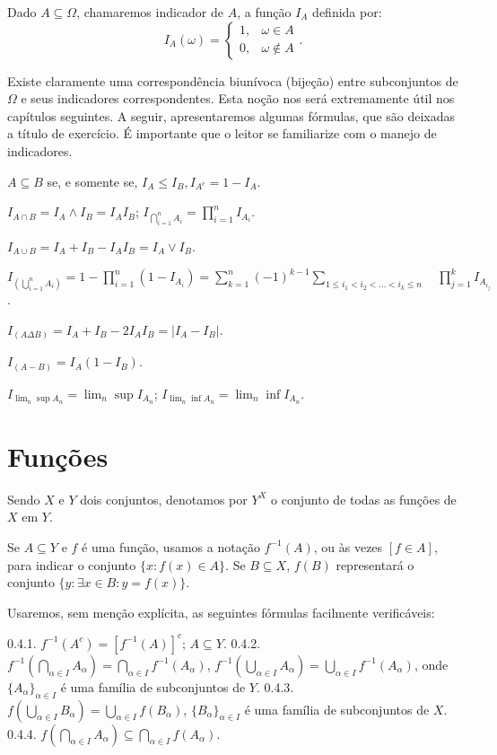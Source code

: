 \documentclass[
]{book}
\begin{document}
Dado \(A \subseteq \Omega\), chamaremos indicador de \(A\), a função \(I_A\) definida por: \[ I_A(\omega) = \begin{cases} 1, & \omega \in A \\ 0, & \omega \notin A \end{cases}. \]

Existe claramente uma correspondência biunívoca (bijeção) entre subconjuntos de \(\Omega\) e seus indicadores correspondentes.
Esta noção nos será extremamente útil nos capítulos seguintes.
A seguir, apresentaremos algumas fórmulas, que são deixadas a título de exercício.
É importante que o leitor se familiarize com o manejo de indicadores.

\(A \subseteq B\) se, e somente se, \(I_A \le I_B, I_{A^c} = 1 - I_A\).

\(I_{A \cap B} = I_A \wedge I_B = I_A I_B\); \(I_{\bigcap\limits_{i=1}^n A_i} = \prod\limits_{i=1}^n I_{A_i}\).

\(I_{A \cup B} = I_A + I_B - I_A I_B = I_A \vee I_B\).

\(I_{(\bigcup\limits_{i=1}^n A_i)} = 1 - \prod\limits_{i=1}^n (1-I_{A_i}) = \sum\limits_{k=1}^n (-1)^{k-1} \sum\limits_{1 \le i_1 < i_2 < \dots < i_k \le n} \quad \prod\limits_{j=1}^k I_{A_{i_j}}\).

\(I_{(A \Delta B)} = I_A + I_B - 2 I_A I_B = |I_A - I_B|\).

\(I_{(A-B)} = I_A(1 - I_B)\).

\(I_{\lim_n \sup A_n} = \lim_n \sup I_{A_n}\); \(I_{\lim_n \inf A_n} = \lim_n \inf I_{A_n}\).

\section{Funções}\label{funuxe7uxf5es}

Sendo \(X\) e \(Y\) dois conjuntos, denotamos por \(Y^X\) o conjunto de todas as funções de \(X\) em \(Y\).

Se \(A \subseteq Y\) e \(f\) é uma função, usamos a notação \(f^{-1}(A)\), ou às vezes \([f \in A]\), para indicar o conjunto \(\{x: f(x) \in A\}\).
Se \(B \subseteq X\), \(f(B)\) representará o conjunto \(\{y: \exists x \in B: y = f(x)\}\).

Usaremos, sem menção explícita, as seguintes fórmulas facilmente verificáveis:

0.4.1.
\(f^{-1}(A^c) = [f^{-1}(A)]^c\); \(A \subseteq Y\).
0.4.2.
\(f^{-1}(\bigcap\limits_{\alpha \in I} A_{\alpha}) = \bigcap\limits_{\alpha \in I} f^{-1}(A_{\alpha})\), \(f^{-1}(\bigcup\limits_{\alpha \in I} A_{\alpha}) = \bigcup\limits_{\alpha \in I} f^{-1}(A_{\alpha})\), onde \(\{A_{\alpha}\}_{\alpha \in I}\) é uma família de subconjuntos de \(Y\).
0.4.3.
\(f(\bigcup\limits_{\alpha \in I} B_{\alpha}) = \bigcup\limits_{\alpha \in I} f(B_{\alpha})\), \(\{B_{\alpha}\}_{\alpha \in I}\) é uma família de subconjuntos de \(X\).
0.4.4.
\(f(\bigcap\limits_{\alpha \in I} A_{\alpha}) \subseteq \bigcap\limits_{\alpha \in I} f(A_{\alpha})\).
\end{document}
